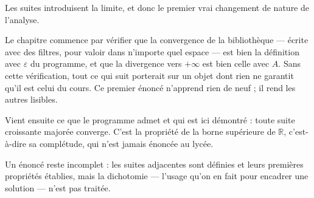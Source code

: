 Les suites introduisent la limite, et donc le premier vrai changement de nature de l'analyse.

Le chapitre commence par vérifier que la convergence de la bibliothèque — écrite avec des
filtres, pour valoir dans n'importe quel espace — est bien la définition avec $\varepsilon$ du
programme, et que la divergence vers $+\infty$ est bien celle avec $A$. Sans cette
vérification, tout ce qui suit porterait sur un objet dont rien ne garantit qu'il est celui
du cours. Ce premier énoncé n'apprend rien de neuf ; il rend les autres lisibles.

Vient ensuite ce que le programme admet et qui est ici démontré : toute suite croissante
majorée converge. C'est la propriété de la borne supérieure de $\mathbb{R}$, c'est-à-dire sa
complétude, qui n'est jamais énoncée au lycée.

Un énoncé reste incomplet : les suites adjacentes sont définies et leurs premières propriétés
établies, mais la dichotomie — l'usage qu'on en fait pour encadrer une solution — n'est pas
traitée.
